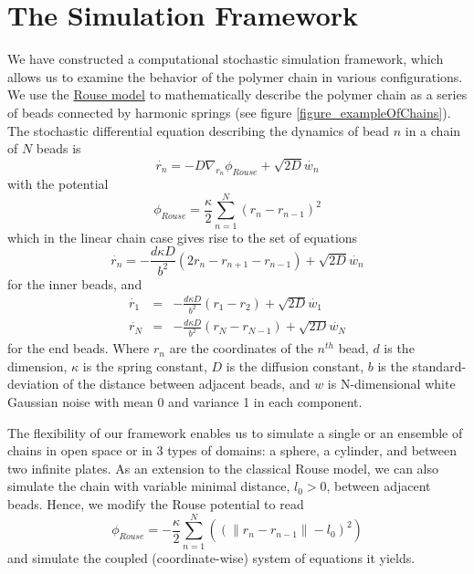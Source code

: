 \documentclass[12pt]{book}
\begin{document}
\section{The Simulation Framework}
We have constructed a computational stochastic simulation framework, which allows us to examine the behavior of the polymer chain in various configurations.
We use the \href{http://en.wikipedia.org/wiki/Rouse_model}{Rouse model} to mathematically describe the polymer chain as a series of beads connected by harmonic springs (see figure \ref{figure_exampleOfChains}). The stochastic differential equation describing the dynamics of bead $n$ in a chain of $N$ beads is 
\begin{equation*}
\dot{r_n} = -D\nabla_{r_n}\phi_{Rouse}+\sqrt{2D}\dot{w_n}
\end{equation*}
with the potential 
\begin{equation*}
\phi_{Rouse}=\frac{\kappa}{2}\sum_{n=1}^N \left(r_n-r_{n-1}\right)^2
\end{equation*}
which in the linear chain case gives rise to the set of equations
\begin{equation*}
\dot{r_n}= -\frac{d\kappa D}{b^2}\left(2r_n-r_{n+1}-r_{n-1}\right)+\sqrt{2D}\dot{w_n}
\end{equation*}
for the inner beads, and 
\begin{eqnarray*}
\dot{r_1} &=& -\frac{d\kappa D}{b^2}\left(r_1-r_{2}\right)+\sqrt{2D}\dot{w_1}\\
\dot{r_N} &=& -\frac{d\kappa D}{b^2}\left(r_N-r_{N-1}\right)+\sqrt{2D}\dot{w_N}
\end{eqnarray*} 
for the end beads. Where $r_n$ are the coordinates of the $n^{th}$ bead, $d$ is the dimension, $\kappa$ is the spring constant, $D$ is the diffusion constant, $b$ is the standard-deviation of the distance between adjacent beads, and $w$ is N-dimensional white Gaussian noise with mean 0 and variance 1 in each component. 


The flexibility of our framework enables us to simulate a single or an ensemble of chains in open space or in 3 types of domains: a sphere, a cylinder, and between two infinite plates. As an extension to the classical Rouse model, we can also simulate the chain with variable minimal distance, $l_0>0$, between adjacent beads. Hence, we modify the Rouse potential to read
\begin{equation*}
\phi_{Rouse}=-\frac{\kappa}{2}\sum_{n=1}^N\left((\|r_n-r_{n-1}\|-l_0)^2\right)
\end{equation*}
and simulate the coupled (coordinate-wise) system of equations it yields.
\end{document}
